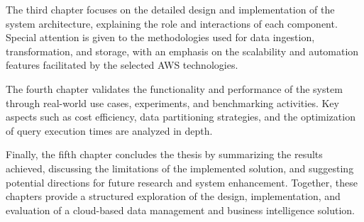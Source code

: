The third chapter focuses on the detailed design and implementation of the system architecture, explaining the role and interactions of each component. Special attention is given to the methodologies used for data ingestion, transformation, and storage, with an emphasis on the scalability and automation features facilitated by the selected \ac{AWS} technologies. 

The fourth chapter validates the functionality and performance of the system through real-world use cases, experiments, and benchmarking activities. Key aspects such as cost efficiency, data partitioning strategies, and the optimization of query execution times are analyzed in depth. 

Finally, the fifth chapter concludes the thesis by summarizing the results achieved, discussing the limitations of the implemented solution, and suggesting potential directions for future research and system enhancement. Together, these chapters provide a structured exploration of the design, implementation, and evaluation of a cloud-based data management and business intelligence solution.